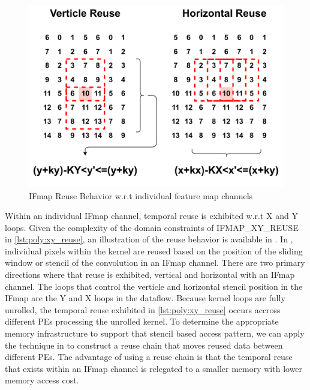 \begin{figure}[]
    \centering
    \includegraphics[scale=0.4]{fig/xy_reuse.pdf}
    \caption{IFmap Reuse Behavior w.r.t individual feature map channels}
    \label{fig:ifmap_xy_reuse}
\end{figure}

Within an individual IFmap channel, temporal reuse is exhibited w.r.t X and Y
loops. Given the complexity of the domain constraints of IFMAP\_XY\_REUSE in
\autoref{lst:poly:xy_reuse}, an illustration of the reuse behavior is available
in . In , individual
pixels within the kernel are reused based on the position of the sliding window
or stencil of the convolution in an IFmap channel. There are two primary
directions where that reuse is exhibited, vertical and horizontal with an IFmap
channel. The loops that control the verticle and horizontal stencil position in
the IFmap are the Y and X loops in the dataflow. Because kernel loops are fully
unrolled, the temporal reuse exhibited in \autoref{lst:poly:xy_reuse} occurs
accross different PEs processing the unrolled kernel. To determine the appropriate memory
infrastructure to support that stencil based access pattern, we can apply the
technique in \cite{meeus} to construct a reuse chain that moves reused data
between different PEs. The advantage of using a reuse chain is that the
temporal reuse that exists within an IFmap channel is relegated to a smaller
memory with lower memory access cost.

